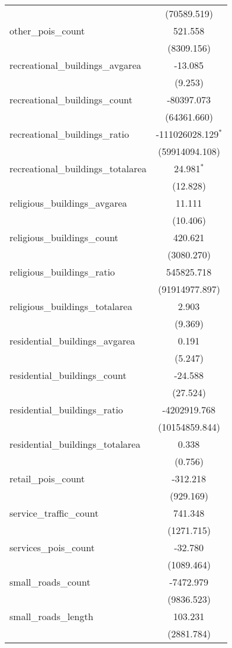 \begin{table}[!htbp]
\begin{tabular}{@{\extracolsep{5pt}}lc}
  & (70589.519) \\
 other_pois_count & 521.558$^{}$ \\
  & (8309.156) \\
 recreational_buildings_avgarea & -13.085$^{}$ \\
  & (9.253) \\
 recreational_buildings_count & -80397.073$^{}$ \\
  & (64361.660) \\
 recreational_buildings_ratio & -111026028.129$^{*}$ \\
  & (59914094.108) \\
 recreational_buildings_totalarea & 24.981$^{*}$ \\
  & (12.828) \\
 religious_buildings_avgarea & 11.111$^{}$ \\
  & (10.406) \\
 religious_buildings_count & 420.621$^{}$ \\
  & (3080.270) \\
 religious_buildings_ratio & 545825.718$^{}$ \\
  & (91914977.897) \\
 religious_buildings_totalarea & 2.903$^{}$ \\
  & (9.369) \\
 residential_buildings_avgarea & 0.191$^{}$ \\
  & (5.247) \\
 residential_buildings_count & -24.588$^{}$ \\
  & (27.524) \\
 residential_buildings_ratio & -4202919.768$^{}$ \\
  & (10154859.844) \\
 residential_buildings_totalarea & 0.338$^{}$ \\
  & (0.756) \\
 retail_pois_count & -312.218$^{}$ \\
  & (929.169) \\
 service_traffic_count & 741.348$^{}$ \\
  & (1271.715) \\
 services_pois_count & -32.780$^{}$ \\
  & (1089.464) \\
 small_roads_count & -7472.979$^{}$ \\
  & (9836.523) \\
 small_roads_length & 103.231$^{}$ \\
  & (2881.784) \\

\end{tabular}
\end{table}
